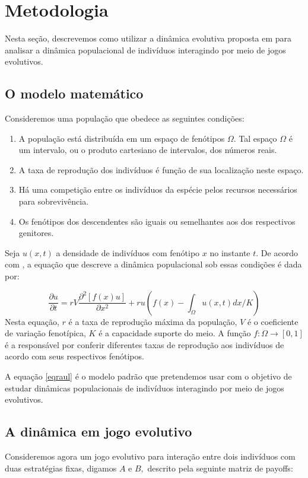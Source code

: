 \documentclass[
	12pt,				%
	openany,			%
	oneoside,			%
	a4paper,			%
	english,			%
	spanish,			%
	brazil,				%
	]{abntex2}
\begin{document}
  
\chapter{Metodologia}

Nesta seção, descrevemos como utilizar a dinâmica evolutiva proposta em \cite{RAAT,Assis20121507} para analisar a dinâmica populacional de indivíduos interagindo por meio de jogos evolutivos.  

\section{O modelo matemático}
Consideremos uma população que obedece as seguintes condições:
\begin{enumerate}
\item A população está distribuída em um espaço de fenótipos $\Omega$. Tal espaço $\Omega$ é um intervalo, ou o produto cartesiano de intervalos, dos números reais. 
\item A taxa de reprodução dos indivíduos é função de sua localização neste espaço. 
\item Há uma competição entre os indivíduos da espécie pelos recursos necessários para sobrevivência. 
\item Os fenótipos dos descendentes são iguais ou semelhantes aos dos respectivos genitores.
\end{enumerate}
Seja $u(x,t)$ a densidade de indivíduos com fenótipo $x$ no instante $t$. De acordo com \cite{RAAT}, a equação que descreve a dinâmica populacional sob essas condições é dada por:

\begin{equation}\label{eqraul}
\frac{\partial u}{\partial t}=rV\frac{\partial^2\left[f(x)u\right]}{\partial x^2}+ru\left(f(x)-\int_{\Omega}u(x,t)dx/K\right)
\end{equation}
Nesta equação, $r$ é a taxa de reprodução máxima da população, $V$ é o coeficiente de variação fenotípica, $K$ é a capacidade suporte do meio. A função $f:\Omega\to[0,1]$ é a responsável por conferir diferentes taxas de reprodução aos indivíduos de acordo com seus respectivos fenótipos.

A equação \ref{eqraul} é o modelo padrão que pretendemos usar com o objetivo de estudar dinâmicas populacionais de indivíduos interagindo por meio de jogos evolutivos. 

\section{A dinâmica em jogo evolutivo}
Consideremos agora um jogo evolutivo para interação entre dois indivíduos com duas estratégias fixas, digamos $A$ e $B,$ descrito pela seguinte matriz de payoffs:
\end{document}
